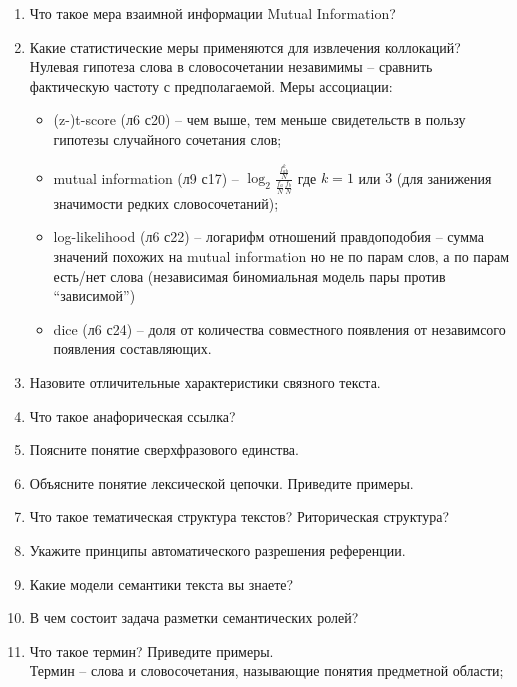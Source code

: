 \documentclass[a4paper]{article}
\newcommand{\eng}[1]{\foreignlanguage{english}{#1}}
\begin{document}
\begin{enumerate}
	\item Что такое мера взаимной информации Mutual Information?\hfill\\
	\item Какие статистические меры применяются для извлечения коллокаций?\hfill\\
	Нулевая гипотеза слова в словосочетании незавимимы -- сравнить фактическую частоту с предполагаемой. Меры ассоциации: \begin{itemize}
		\item \eng{(z-)t-score} (л6 с20) -- чем выше, тем меньше свидетельств в пользу гипотезы случайного сочетания слов;
		\item \eng{mutual information} (л9 с17) -- $\log_2 \frac{ \frac{f_{ab}^k}{N}}{ \frac{f_a}{N}\frac{f_b}{N}}$ где $k = 1$ или $3$ (для занижения значимости редких словосочетаний);  
		\item \eng{log-likelihood} (л6 с22) -- логарифм отношений правдоподобия -- сумма значений похожих на mutual information но не по парам слов, а по парам есть/нет слова (независимая биномиальная модель пары против ``зависимой'')
		\item \eng{dice} (л6 с24) -- доля от количества совместного появления от незавимсого появления составляющих.
	\end{itemize}

	\item Назовите отличительные характеристики связного текста.\hfill\\
	\item Что такое анафорическая ссылка?\hfill\\
	\item Поясните понятие сверхфразового единства.\hfill\\
	\item Объясните понятие лексической цепочки. Приведите примеры.\hfill\\
	\item Что такое тематическая структура текстов? Риторическая структура?\hfill\\
	\item Укажите принципы автоматического разрешения референции.\hfill\\
	\item Какие модели семантики текста вы знаете?\hfill\\
	\item В чем состоит задача разметки семантических ролей?\hfill\\

	\item Что такое термин? Приведите примеры.\hfill\\
	Термин -- слова и словосочетания, называющие понятия предметной области;


\end{enumerate}
\end{document}
